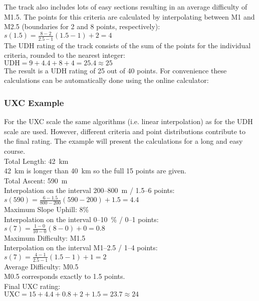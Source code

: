 \documentclass[a4paper,oneside]{scrartcl}
\begin{document}
The track also includes lots of easy sections resulting in an average difficulty
of M1.5. The points for this criteria are calculated by interpolating between M1 and M2.5
(boundaries for 2 and 8 points, respectively): 
$s(1.5) = \frac{8 - 2}{2.5 - 1} (1.5 - 1) + 2 = 4$\\

The UDH rating of the track consists of the sum of the points for the individual criteria, 
rounded to the nearest integer:\\
$\mathrm{UDH} = 9 + 4.4 + 8 + 4 = 25.4 \approx 25$\\
The result is a UDH rating of 25 out of 40 points. For convenience these calculations 
can be automatically done using the online calculator: %

\subsubsection{UXC Example}
For the UXC scale the same algorithms (i.e. linear interpolation) as for the UDH scale are used. However, different criteria and point distributions contribute
to the final rating. The example will present the calculations for a long and easy course.\\

{\parindent0pt
Total Length: 42~km\\
42~km is longer than 40~km so the full 15 points are given. \\

Total Ascent: 590~m\\
Interpolation on the interval 200--800~m / 1.5--6 points:\\
$s(590) = \frac{6 - 1.5}{800 - 200} (590 - 200) + 1.5 = 4.4$\\

Maximum Slope Uphill:  8\% \\
Interpolation on the interval 0--10~\% / 0--1 points:\\
$s(7) = \frac{1 - 0}{10 - 0} (8 - 0) + 0 = 0.8$\\

Maximum Difficulty: M1.5\\
Interpolation on the interval M1--2.5 / 1--4 points:\\
$s(7) = \frac{4 - 1}{2.5 - 1} (1.5 - 1) + 1 = 2$\\

Average Difficulty: M0.5\\
M0.5 corresponds exactly to 1.5 points.\\

Final UXC rating:\\
$\mathrm{UXC} = 15 + 4.4 + 0.8 + 2 + 1.5 = 23.7 \approx 24$\\
}
\end{document}
